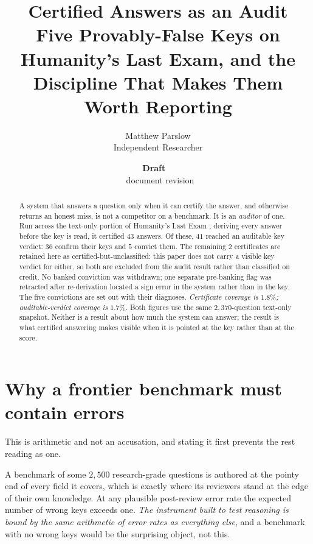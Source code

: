\documentclass[11pt,a4paper]{article}
\title{Certified Answers as an Audit\\\large Five Provably-False Keys on Humanity's Last Exam, and the Discipline That Makes Them Worth Reporting}
\author{Matthew Parslow\\Independent Researcher}
\date{\textbf{Draft \texorpdfstring{\textemdash}{---}\ \PaperDraft}\\[2pt]\PaperDisplayDate \texorpdfstring{\textbullet}{\textperiodcentered}\ document revision \PaperRevision}
\theoremstyle{remark}
\begin{document}
\maketitle
\begin{center}
\end{center}
\vspace{1em}

\begin{abstract}
A system that answers a question only when it can certify the answer, and otherwise returns an honest
miss, is not a competitor on a benchmark. It is an \emph{auditor} of one. Run across the text-only
portion of Humanity's Last Exam \citep{phan2025}, deriving every answer before the key is read, it
certified $43$ answers. Of these, $41$ reached an auditable key verdict: $36$ confirm their keys and
$5$ convict them. The remaining $2$ certificates are retained here as certified-but-unclassified: this paper does
not carry a visible key verdict for either, so both are excluded from the audit result rather than
classified on credit. No banked
conviction was withdrawn; one separate pre-banking flag was retracted after re-derivation located a
sign error in the system rather than in the key. The five convictions are set out with their diagnoses.
\emph{Certificate coverage is $1.8\%$; auditable-verdict coverage is $1.7\%$.} Both figures use the
same $2{,}370$-question text-only snapshot. Neither is a result about how much the system can answer;
the result is what certified answering makes visible when it is pointed at the key rather than at the
score.
\end{abstract}

\section{Why a frontier benchmark must contain errors}\label{sec:why}
This is arithmetic and not an accusation, and stating it first prevents the rest reading as one.

A benchmark of some $2{,}500$ research-grade questions is authored at the pointy end of every field it
covers, which is exactly where its reviewers stand at the edge of their own knowledge. At any
plausible post-review error rate the expected number of wrong keys exceeds one. \emph{The instrument
built to test reasoning is bound by the same arithmetic of error rates as everything else}, and a
benchmark with no wrong keys would be the surprising object, not this.
\end{document}
